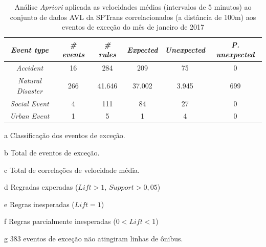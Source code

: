 \documentclass[
	12pt,				%
	oneside,			%
	a4paper,			%
	english,			%
	brazil				%
	]{abntex2ppgsi}
\begin{document}
\begin{apendicesenv}
\begin{table}[!htb]
\centering
\begin{threeparttable}
\caption {Análise \textit{Apriori} aplicada as velocidades médias (intervalos de 5 minutos) ao conjunto de dados AVL da SPTrans correlacionados (a distância de 100m) aos eventos de exceção do mês de janeiro de 2017}
\label {tab:aprioriFull}
\begin{tabular}{c|c|c|c|c|c}
\hline
\textbf{\textit{Event type}}\tnote{a} & \textbf{\textit{\# events}}\tnote{b} & \textit{\textbf{\# rules}}\tnote{c} & \textbf{\textit{Expected}}\tnote{d} & \textbf{\textit{Unexpected}}\tnote{e} & \textbf{\textit{P. unexpected}}\tnote{f}   \\
\hline
\textit{Accident} & 16 & 284 & 209 & 75 & 0 \\
\textit{Natural 	Disaster} & 266 & 41.646 & 37.002 & 3.945 & 699 \\
\textit{Social Event} & 4 & 111 & 84 & 27 & 0 \\
\textit{Urban Event} & 1 & 5 & 1 & 4 & 0 \\
\hline
\end{tabular}
\begin{tablenotes}
            \item[a] Classificação dos eventos de exceção.
            \item[b] Total de eventos de exceção.
            \item[c] Total de correlações de velocidade média.
            \item[d] Regradas experadas ($Lift > 1$, $Support > 0,05$)
            \item[e] Regras inesperadas ($Lift = 1$)
            \item[f] Regras parcialmente inesperadas ($0 < Lift < 1$)
            \item[g] 383 eventos de exceção não atingiram linhas de ônibus.
        \end{tablenotes}
\end{threeparttable}
\end{table}


\end{apendicesenv}
\end{document}
